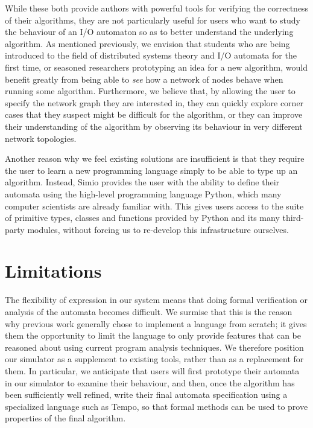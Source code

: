 \documentclass{scrartcl}
\begin{document}
While these both provide authors with powerful tools for verifying the
correctness of their algorithms, they are not particularly useful for users who
want to study the behaviour of an I/O automaton so as to better understand the
underlying algorithm. As mentioned previously, we envision that students who
are being introduced to the field of distributed systems theory and I/O
automata for the first time, or seasoned researchers prototyping an idea for a
new algorithm, would benefit greatly from being able to \textit{see} how a
network of nodes behave when running some algorithm. Furthermore, we believe
that, by allowing the user to specify the network graph they are interested in,
they can quickly explore corner cases that they suspect might be difficult for
the algorithm, or they can improve their understanding of the algorithm by
observing its behaviour in very different network topologies.

Another reason why we feel existing solutions are insufficient is that they
require the user to learn a new programming language simply to be able to type
up an algorithm. Instead, Simio provides the user with the ability to define
their automata using the high-level programming language Python, which many
computer scientists are already familiar with. This gives users access to the
suite of primitive types, classes and functions provided by Python and its many
third-party modules, without forcing us to re-develop this infrastructure
ourselves.

\section{Limitations}

The flexibility of expression in our system means that doing formal verification
or analysis of the automata becomes difficult. We surmise that this is the
reason why previous work generally chose to implement a language from scratch;
it gives them the opportunity to limit the language to only provide features
that can be reasoned about using current program analysis techniques. We
therefore position our simulator as a supplement to existing tools, rather than
as a replacement for them. In particular, we anticipate that users will first
prototype their automata in our simulator to examine their behaviour, and then,
once the algorithm has been sufficiently well refined, write their final
automata specification using a specialized language such as Tempo, so that
formal methods can be used to prove properties of the final algorithm.
\end{document}
